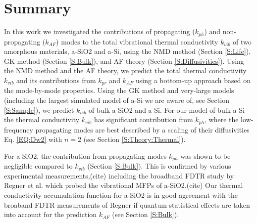 \documentclass[aps,prb,twocolumn,superscriptaddress,footinbib,amsmath,amssymb,floatfix]{revtex4}
\begin{document}
\section{\label{S:Lifetimes}Summary}

In this work we investigated the contributions of propagating ($k_{ph}$) 
and non-propagating ($k_{AF}$) modes to the total vibrational 
thermal conductivity $k_{vib}$ of two amorphous materials, 
a-SiO2 and a-Si, using the NMD method (Section \ref{S:Life}), 
GK method (Section \ref{S:Bulk}), 
and AF theory (Section \ref{S:Diffusivities}). 
Using the NMD method and the AF theory, 
we predict the total thermal conductivity $k_{vib}$ and its 
contributions from $k_{pr}$ and $k_{AF}$ using a bottom-up approach 
based on the mode-by-mode properties. Using the GK method and very-large 
models (including the largest simulated model of a-Si we are aware of, 
see Section \ref{S:Sample}), 
we predict $k_{vib}$ of bulk a-SiO2 and a-Si. For our model of bulk a-Si 
the thermal conductivity $k_{vib}$ has  
significant contribution from $k_{ph}$, where the low-frequency 
propagating modes are best described by a scaling of their 
diffusivities Eq. \eqref{EQ:Dw2} with $n=2$ (see Section \ref{S:Theory:Thermal}).  

For a-SiO2, the contribution from propagating modes $k_{ph}$ was shown to 
be negligible compared to $k_{vib}$ (Section \ref{S:Bulk}). 
This is confirmed by various 
experimental measurements,(cite) including the broadband FDTR study 
by Regner et al. which 
probed the vibrational MFPs of a-SiO2.(cite) Our thermal conductivity 
accumulation function for a-SiO2 is in good agreement with the 
broaband FDTR measurements of Regner if quantum statistical effects are 
taken into account for the prediction $k_{AF}$ 
(see Section \ref{S:Bulk}). 
\end{document}
